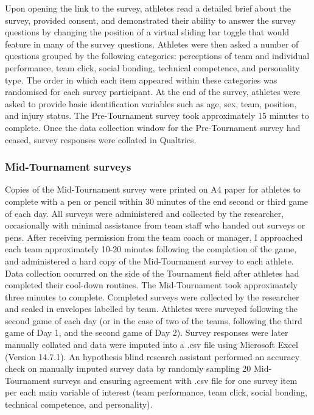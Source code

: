 \begin{CJK}{UTF8}{gbsn}
Upon opening the link to the survey, athletes read a detailed brief about the survey, provided consent, and demonstrated their ability to answer the survey questions by changing the position of a virtual sliding bar toggle that would feature in many of the survey questions.  Athletes were then asked a number of questions grouped by the following categories: perceptions of team and individual performance, team click, social bonding, technical competence, and personality type. The order in which each item appeared within these categories was randomised for each survey participant. At the end of the survey, athletes were asked to provide basic identification variables such as age, sex, team, position, and injury status.  The Pre-Tournament survey took approximately 15 minutes to complete.  Once the data collection window for the Pre-Tournament survey had ceased, survey responses were collated in Qualtrics.

\subsubsection{Mid-Tournament surveys}
Copies of the Mid-Tournament survey were printed on A4 paper for athletes to complete with a pen or pencil within 30 minutes of the end second or third game of each day.  All surveys were administered and collected by the researcher, occasionally with minimal assistance from team staff who handed out surveys or pens. After receiving permission from the team coach or manager, I approached each team approximately 10-20 minutes following the completion of the game, and administered a hard copy of the Mid-Tournament survey to each athlete.  Data collection occurred on the side of the Tournament field after athletes had completed their cool-down routines.  The Mid-Tournament took approximately three minutes to complete. Completed surveys were collected by the researcher and sealed in envelopes labelled by team. Athletes were surveyed following the second game of each day (or in the case of two of the teams, following the third game of Day 1, and the second game of Day 2).  Survey responses were later manually collated and data were imputed into a .csv file using Microsoft Excel (Version 14.7.1).  An hypothesis blind research assistant performed an accuracy check on manually imputed survey data by randomly sampling 20 Mid-Tournament surveys and ensuring agreement with .csv file for one survey item per each main variable of interest (team performance, team click, social bonding, technical competence, and personality).


\end{CJK}
